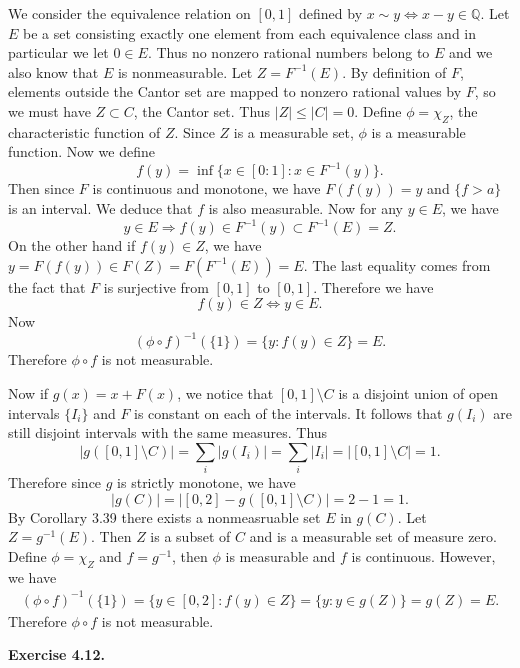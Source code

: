\begin{exercise}{4.5}
  We consider the equivalence relation on $[0,1]$ defined by $x\sim y\Leftrightarrow x-y\in\mathbb{Q}$.
  Let $E$ be a set consisting exactly one element from each equivalence class and in particular we let $0\in E$.
  Thus no nonzero rational numbers belong to $E$ and we also know that $E$ is nonmeasurable.
  Let $Z=F^{-1}(E)$.
  By definition of $F$, elements outside the Cantor set are mapped to nonzero rational values by $F$,
  so we must have $Z\subset C$, the Cantor set.
  Thus $|Z|\leq |C|=0.$ Define $\phi=\chi_Z$, the characteristic function of $Z$.
  Since $Z$ is a measurable set, $\phi$ is a measurable function.
  Now we define \[f(y)=\inf\{x\in[0:1]:x\in F^{-1}(y)\}.\]
  Then since $F$ is continuous and monotone, we have $F(f(y))=y$ and $\{f>a\}$ is an interval.
  We deduce that $f$ is also measurable.
  Now for any $y\in E$, we have \[y\in E\Rightarrow f(y)\in F^{-1}(y)\subset F^{-1}(E)=Z.\]
  On the other hand if $f(y)\in Z$, we have $y=F(f(y))\in F(Z)=F(F^{-1}(E))=E$.
  The last equality comes from the fact that $F$ is surjective from $[0,1]$ to $[0,1]$.
  Therefore we have \[f(y)\in Z\Leftrightarrow y\in E.\]
  Now \[(\phi\circ f)^{-1}(\{1\})=\{y:f(y)\in Z\}=E.\]
  Therefore $\phi\circ f$ is not measurable.

  Now if $g(x)=x+F(x)$, we notice that $[0,1]\setminus C$ is a disjoint union of open intervals $\{I_i\}$
  and $F$ is constant on each of the intervals.
  It follows that $g(I_i)$ are still disjoint intervals with the same measures.
  Thus \[|g([0,1]\setminus C)|=\sum_i|g(I_i)|=\sum_i|I_i|=|[0,1]\setminus C|=1.\]
  Therefore since $g$ is strictly monotone, we have \[|g(C)|=|[0,2]-g([0,1]\setminus C)|=2-1=1.\]
  By Corollary 3.39 there exists a nonmeasruable set $E$ in $g(C)$.
  Let $Z=g^{-1}(E)$.
  Then $Z$ is a subset of $C$ and is a measurable set of measure zero.
  Define $\phi=\chi_Z$ and $f=g^{-1}$, then $\phi$ is measurable and $f$ is continuous.
  However, we have
  \begin{align*}
  (\phi\circ f)^{-1}(\{1\})=\{y\in[0,2]:f(y)\in Z\}=\{y:y\in g(Z)\}=g(Z)=E.
  \end{align*}
  Therefore $\phi\circ f$ is not measurable.
\end{exercise}

\noindent\textbf{Exercise 4.12. }


